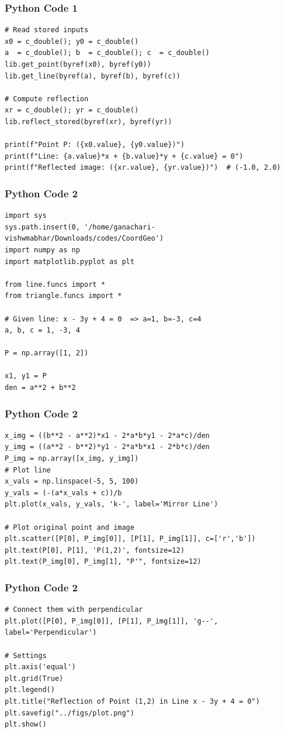 \documentclass{beamer}
\begin{document}
\begin{frame}[fragile]
    \frametitle{Python Code 1}
    \begin{lstlisting}
# Read stored inputs
x0 = c_double(); y0 = c_double()
a  = c_double(); b  = c_double(); c  = c_double()
lib.get_point(byref(x0), byref(y0))
lib.get_line(byref(a), byref(b), byref(c))

# Compute reflection
xr = c_double(); yr = c_double()
lib.reflect_stored(byref(xr), byref(yr))

print(f"Point P: ({x0.value}, {y0.value})")
print(f"Line: {a.value}*x + {b.value}*y + {c.value} = 0")
print(f"Reflected image: ({xr.value}, {yr.value})")  # (-1.0, 2.0)
    \end{lstlisting}
\end{frame}

\begin{frame}[fragile]
    \frametitle{Python Code 2}
    \begin{lstlisting}
import sys
sys.path.insert(0, '/home/ganachari-vishwmabhar/Downloads/codes/CoordGeo')
import numpy as np
import matplotlib.pyplot as plt

from line.funcs import *
from triangle.funcs import *

# Given line: x - 3y + 4 = 0  => a=1, b=-3, c=4
a, b, c = 1, -3, 4

P = np.array([1, 2])

x1, y1 = P
den = a**2 + b**2
    \end{lstlisting}
\end{frame}

\begin{frame}[fragile]
    \frametitle{Python Code 2}
    \begin{lstlisting}
x_img = ((b**2 - a**2)*x1 - 2*a*b*y1 - 2*a*c)/den
y_img = ((a**2 - b**2)*y1 - 2*a*b*x1 - 2*b*c)/den
P_img = np.array([x_img, y_img])
# Plot line
x_vals = np.linspace(-5, 5, 100)
y_vals = (-(a*x_vals + c))/b
plt.plot(x_vals, y_vals, 'k-', label='Mirror Line')

# Plot original point and image
plt.scatter([P[0], P_img[0]], [P[1], P_img[1]], c=['r','b'])
plt.text(P[0], P[1], 'P(1,2)', fontsize=12)
plt.text(P_img[0], P_img[1], "P'", fontsize=12)

    \end{lstlisting}
\end{frame}

\begin{frame}[fragile]
    \frametitle{Python Code 2}
    \begin{lstlisting}
# Connect them with perpendicular
plt.plot([P[0], P_img[0]], [P[1], P_img[1]], 'g--', label='Perpendicular')

# Settings
plt.axis('equal')
plt.grid(True)
plt.legend()
plt.title("Reflection of Point (1,2) in Line x - 3y + 4 = 0")
plt.savefig("../figs/plot.png")
plt.show()
    \end{lstlisting}
\end{frame}
\end{document}
